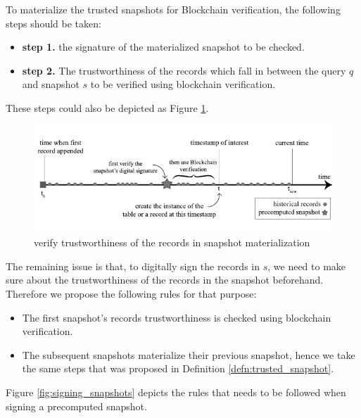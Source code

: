 			\begin{defn} 
				To materialize the trusted snapshots for Blockchain verification, the following steps should be taken: 
				\begin{itemize}
					\item \textbf{step 1.} the signature of the materialized snapshot to be checked.
					\item \textbf{step 2.} The trustworthiness of the records which fall in between the query $q$ and snapshot $s$ to be verified using blockchain verification.
				\end{itemize}
				These steps could also be depicted as Figure \ref{fig:blockchain_snapshot_materialization}.
			\label{defn:trusted_snapshot}
			\end{defn}
			\begin{figure}
				\centering
				\includegraphics[width=\textwidth]{figs/trusted_snapshot_materialization.pdf}
				\caption{verify trustworthiness of the records in snapshot materialization}
				\label{fig:blockchain_snapshot_materialization}
			\end{figure}

			The remaining issue is that, to digitally sign the records in $s$, we need to make sure about the trustworthiness of the records in the snapshot beforehand. Therefore we propose the following rules for that purpose:

			\begin{itemize}
				\item The first snapshot's records trustworthiness is checked using blockchain verification.
				\item The subsequent snapshots materialize their previous snapshot, hence we take the same steps that was proposed in Definition \ref{defn:trusted_snapshot}.
			\end{itemize}

			Figure \ref{fig:signing_snapshots} depicts the rules that needs to be followed when signing a precomputed snapshot.

